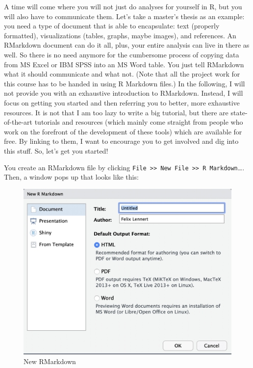 \documentclass[
]{book}
\begin{document}
A time will come where you will not just do analyses for yourself in R, but you will also have to communicate them. Let's take a master's thesis as an example: you need a type of document that is able to encapsulate: text (properly formatted), visualizations (tables, graphs, maybe images), and references. An RMarkdown document can do it all, plus, your entire analysis can live in there as well. So there is no need anymore for the cumbersome process of copying data from MS Excel or IBM SPSS into an MS Word table. You just tell RMarkdown what it should communicate and what not. (Note that all the project work for this course has to be handed in using R Markdown files.) In the following, I will not provide you with an exhaustive introduction to RMarkdown. Instead, I will focus on getting you started and then referring you to better, more exhaustive resources. It is not that I am too lazy to write a big tutorial, but there are state-of-the-art tutorials and resources (which mainly come straight from people who work on the forefront of the development of these tools) which are available for free. By linking to them, I want to encourage you to get involved and dig into this stuff. So, let's get you started!

You create an RMarkdown file by clicking \texttt{File\ \textgreater{}\textgreater{}\ New\ File\ \textgreater{}\textgreater{}\ R\ Markdown}\ldots. Then, a window pops up that looks like this:

\begin{figure}
\centering
\includegraphics{figures/new_markdown_1.png}
\caption{New RMarkdown}
\end{figure}
\end{document}
